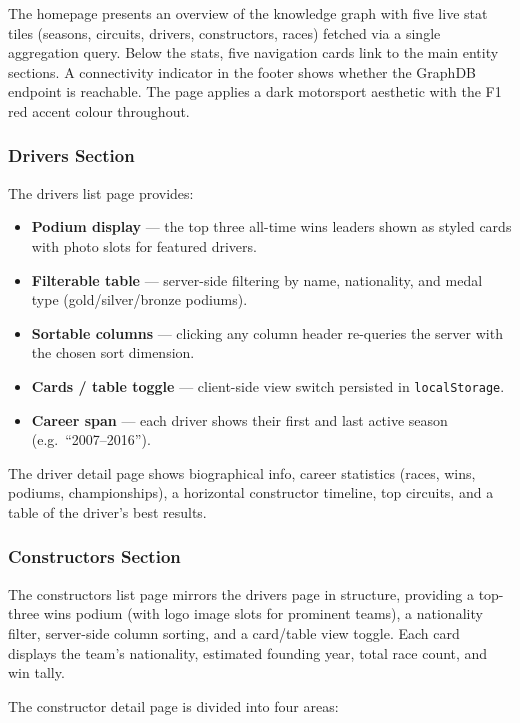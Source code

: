 \documentclass[12pt,a4paper]{article}
\begin{document}
The homepage presents an overview of the knowledge graph with five live stat
tiles (seasons, circuits, drivers, constructors, races) fetched via a single
aggregation query. Below the stats, five navigation cards link to the main
entity sections. A connectivity indicator in the footer shows whether the
GraphDB endpoint is reachable. The page applies a dark motorsport aesthetic
with the F1 red accent colour throughout.

\subsubsection{Drivers Section}

The drivers list page provides:
\begin{itemize}[leftmargin=1.5em]
  \item \textbf{Podium display} --- the top three all-time wins leaders shown as
        styled cards with photo slots for featured drivers.
  \item \textbf{Filterable table} --- server-side filtering by name, nationality,
        and medal type (gold/silver/bronze podiums).
  \item \textbf{Sortable columns} --- clicking any column header re-queries the
        server with the chosen sort dimension.
  \item \textbf{Cards / table toggle} --- client-side view switch persisted in
        \texttt{localStorage}.
  \item \textbf{Career span} --- each driver shows their first and last active
        season (e.g.\ ``2007--2016'').
\end{itemize}

The driver detail page shows biographical info, career statistics (races, wins,
podiums, championships), a horizontal constructor timeline, top circuits, and a
table of the driver's best results.

\subsubsection{Constructors Section}

The constructors list page mirrors the drivers page in structure, providing a
top-three wins podium (with logo image slots for prominent teams), a
nationality filter, server-side column sorting, and a card/table view toggle.
Each card displays the team's nationality, estimated founding year, total race
count, and win tally.

The constructor detail page is divided into four areas:
\end{document}

